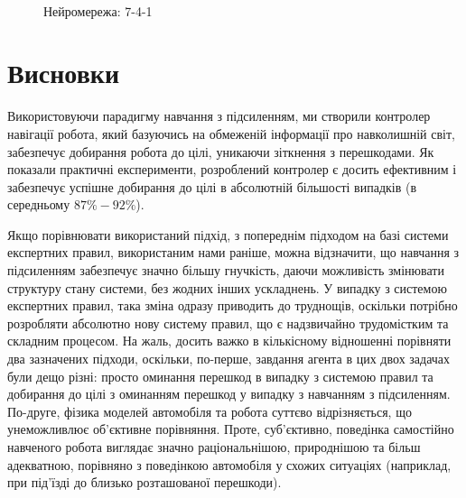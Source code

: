 \documentclass[a4paper,10pt,fleqn]{article}
\begin{document}
\begin{figure}[h]
  \centering
  \,
  \,
  \caption{Нейромережа: 7-4-1}
  \label{fig:spikes-spikes-7}
\end{figure}

\clearpage

\section{Висновки}

Використовуючи парадигму навчання з підсиленням, ми створили контролер навігації робота, який базуючись на обмеженій інформації про навколишній світ, забезпечує добирання робота до цілі, уникаючи зіткнення з перешкодами. Як показали практичні експерименти, розроблений контролер є досить ефективним і забезпечує успішне добирання до цілі в абсолютній більшості випадків (в середньому $87\%-92\%$).

Якщо порівнювати використаний підхід, з попереднім підходом на базі системи експертних правил, використаним нами раніше, можна відзначити, що навчання з підсиленням забезпечує значно більшу гнучкість, даючи можливість змінювати структуру стану системи, без жодних інших ускладнень. У випадку з системою експертних правил, така зміна одразу приводить до труднощів, оскільки потрібно розробляти абсолютно нову систему правил, що є надзвичайно трудомістким та складним процесом. На жаль, досить важко в кількісному відношенні порівняти два зазначених підходи, оскільки, по-перше, завдання агента в цих двох задачах були дещо різні: просто оминання перешкод в випадку з системою правил та добирання до цілі з оминанням перешкод у випадку з навчанням з підсиленням. По-друге, фізика моделей автомобіля та робота суттєво відрізняється, що унеможливлює об'єктивне порівняння. Проте, суб'єктивно, поведінка самостійно навченого робота виглядає значно раціональнішою, природнішою та більш адекватною, порівняно з поведінкою автомобіля у схожих ситуаціях (наприклад, при під'їзді до близько розташованої перешкоди).
\end{document}
